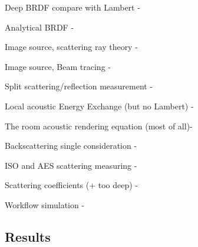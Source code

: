 Deep BRDF compare with Lambert - \citet{miller2015real}

Analytical BRDF - \citet{durany2015analytical}

Image source, scattering ray theory - \citet{chandak2011fast} 

Image source, Beam tracing - \citet{funkhouser2003survey}

Split scattering/reflection measurement - \citet{vorlander2000definition}

Local acoustic Energy Exchange (but no Lambert) - \citet{rober2007ray}

The room acoustic rendering equation (most of all)- \citet{siltanen2007room}

Backscattering single consideration - \citet{LURTON,Etter2013}

ISO and AES scattering measuring - \citet{rindel2001scattering}

Scattering coefficients (+ too deep) - \citet{cox2006tutorial}

Workflow simulation - \citet{bell1997simulation}

\subsection{Results}
